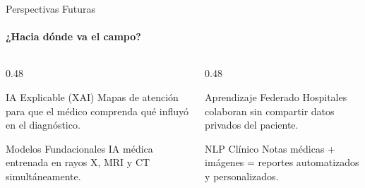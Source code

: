 \begin{frame}{Perspectivas Futuras}
\framesubtitle{¿Hacia dónde va el campo?}

\begin{columns}[T]
\begin{column}{0.48\textwidth}
\begin{block}{\faSearch\; IA Explicable (XAI)}
Mapas de atención para que el médico comprenda qué influyó en el diagnóstico.
\end{block}
\vspace{3pt}
\begin{block}{\faCubes\; Modelos Fundacionales}
IA médica entrenada en rayos X, MRI y CT simultáneamente.
\end{block}
\end{column}
\begin{column}{0.48\textwidth}
\begin{block}{\faNetworkWired\; Aprendizaje Federado}
Hospitales colaboran sin compartir datos privados del paciente.
\end{block}
\vspace{3pt}
\begin{block}{\faLanguage\; NLP Clínico}
Notas médicas + imágenes = reportes automatizados y personalizados.
\end{block}
\end{column}
\end{columns}

\end{frame}
